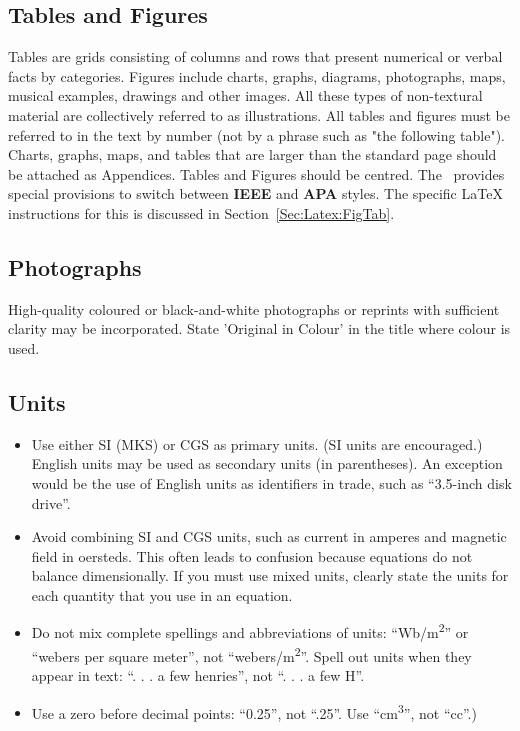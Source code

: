 \documentclass[12pt]{uomthesis}
\begin{document}
\subsection{Tables and Figures}
\label{Sec:Common:TabFig}
Tables are grids consisting of columns and rows that present numerical or verbal facts by categories. Figures include charts, graphs, diagrams, photographs, maps, musical examples, drawings and other images. All these types of non-textural material are collectively referred to as illustrations. All tables and figures must be referred to in the text by number (not by a phrase such as "the following table"). Charts, graphs, maps, and tables that are larger than the standard page should be attached as Appendices. Tables and Figures should be centred. The~\TheClass{} provides special provisions to switch between \textbf{IEEE} and \textbf{APA} styles. The specific \LaTeX{} instructions for this is discussed in Section~\ref{Sec:Latex:FigTab}. 


\subsection{Photographs}
High-quality coloured or black-and-white photographs or reprints with sufficient clarity may be incorporated. State 'Original in Colour’ in the title where colour is used.

\subsection{Units}
\begin{itemize}
\item Use either SI (MKS) or CGS as primary units. (SI units are encouraged.) English units may be used as secondary units (in parentheses). An exception would be the use of English units as identifiers in trade, such as ``3.5-inch disk drive''.
\item Avoid combining SI and CGS units, such as current in amperes and magnetic field in oersteds. This often leads to confusion because equations do not balance dimensionally. If you must use mixed units, clearly state the units for each quantity that you use in an equation.
\item Do not mix complete spellings and abbreviations of units: ``Wb/m\textsuperscript{2}'' or ``webers per square meter'', not ``webers/m\textsuperscript{2}''. Spell out units when they appear in text: ``. . . a few henries'', not ``. . . a few H''.
\item Use a zero before decimal points: ``0.25'', not ``.25''. Use ``cm\textsuperscript{3}'', not ``cc''.)
\end{itemize}
\end{document}
